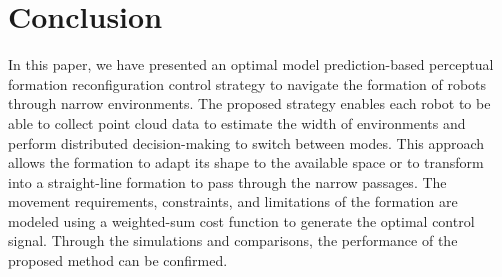 \section{Conclusion}\label{sec:conclusion}

In this paper, we have presented an optimal model prediction-based perceptual formation reconfiguration control strategy to navigate the formation of robots through narrow environments. The proposed strategy enables each robot to be able to collect point cloud data to estimate the width of environments and perform distributed decision-making to switch between modes. This approach allows the formation to adapt its shape to the available space or to transform into a straight-line formation to pass through the narrow passages. The movement requirements, constraints, and limitations of the formation are modeled using a weighted-sum cost function to generate the optimal control signal. Through the simulations and comparisons, the performance of the proposed method can be confirmed.